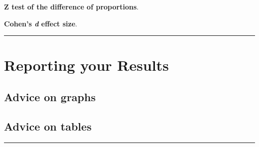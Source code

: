 \documentclass[
]{report}
\begin{document}
\textbf{Z test of the difference of proportions}.

\textbf{Cohen's \emph{d} effect size}.

\begin{center}\rule{0.5\linewidth}{0.5pt}\end{center}

\hypertarget{reporting-your-results}{%
\chapter{Reporting your Results}\label{reporting-your-results}}

\hypertarget{advice-on-graphs}{%
\section{Advice on graphs}\label{advice-on-graphs}}

\hypertarget{advice-on-tables}{%
\section{Advice on tables}\label{advice-on-tables}}

\begin{center}\rule{0.5\linewidth}{0.5pt}\end{center}

  
\end{document}
